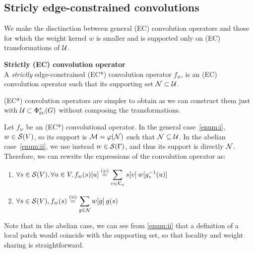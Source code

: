 \subsection{Stricly edge-constrained convolutions}

We make the disctinction between general (EC) convolution operators and those for which the weight kernel $w$ is smaller and is supported only on (EC) transformations of $\cu$.

\begin{definition}\textbf{Strictly (EC) convolution operator}\\
A \emph{strictly} edge-constrained (EC*) convolution operator $f_w$, is an (EC) convolution operator such that its supporting set $\cn \subset \cu$.
\end{definition}

\begin{remark}(EC*) convolution operators are simpler to obtain as we can construct them just with $\cu \subset \Phi^*_{\EC}(G)$ without composing the transformations.
\end{remark}

Let $f_w$ be an (EC*) convolutional operator. In the general case~\ref{enum:i}, $w \in \cs(V)$, so its support is $\cm = \varphi(\cn)$ such that $\cn \subseteq \cu$. In the abelian case~\ref{enum:ii}, we use instead $w \in \cs(\Gamma)$, and thus its support is directly $\cn$.
Therefore, we can rewrite the expressions of the convolution operator as:
\begin{enumerate}[label=(\roman*)]
  \item $\forall s \in \cs(V), \forall u \in V, f_w(s)[u]
          \overset{(\varphi)}= \displaystyle\sum_{v \in \ck_u} s[v] \h{2} w[g_v^{-1}(u)]$ \label{enum:i}
  \item $\forall s \in \cs(V), f_w(s) \overset{(\M)}= \displaystyle\sum_{g \in \cn} w[g] \h{2} g(s)$ \label{enum:ii}
\end{enumerate}

\begin{remark}
Note that in the abelian case, we can see from \ref{enum:ii} that a definition of a local patch would coincide with the supporting set, so that locality and weight sharing is straightforward.
\end{remark}

